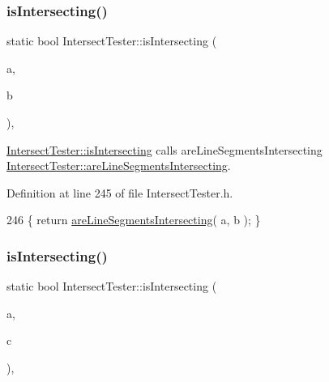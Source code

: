 \subsubsection{\texorpdfstring{is\+Intersecting()}{isIntersecting()}\hspace{0.1cm}{\footnotesize\ttfamily [6/15]}}
{\footnotesize\ttfamily static bool Intersect\+Tester\+::is\+Intersecting (\begin{DoxyParamCaption}\item[{\hyperlink{class_line_segment}{Line\+Segment}}]{a,  }\item[{\hyperlink{class_line_segment}{Line\+Segment}}]{b }\end{DoxyParamCaption})\hspace{0.3cm}{\ttfamily [inline]}, {\ttfamily [static]}}



\hyperlink{class_intersect_tester_a7710e17ff7d2e229059f23b9429213f5}{Intersect\+Tester\+::is\+Intersecting} calls are\+Line\+Segments\+Intersecting  \hyperlink{class_intersect_tester_a0552b121b444528907c1958c02fb217b}{Intersect\+Tester\+::are\+Line\+Segments\+Intersecting}. 



Definition at line 245 of file Intersect\+Tester.\+h.


\begin{DoxyCode}
246     \{ \textcolor{keywordflow}{return} \hyperlink{class_intersect_tester_a0552b121b444528907c1958c02fb217b}{areLineSegmentsIntersecting}( a, b ); \}
\end{DoxyCode}
\mbox{\label{class_intersect_tester_ab2cc7dc060f09e9bf33b197de8ca6f16}} 
\subsubsection{\texorpdfstring{is\+Intersecting()}{isIntersecting()}\hspace{0.1cm}{\footnotesize\ttfamily [7/15]}}
{\footnotesize\ttfamily static bool Intersect\+Tester\+::is\+Intersecting (\begin{DoxyParamCaption}\item[{\hyperlink{class_line_segment}{Line\+Segment}}]{a,  }\item[{\hyperlink{class_circle}{Circle}}]{c }\end{DoxyParamCaption})\hspace{0.3cm}{\ttfamily [inline]}, {\ttfamily [static]}}



